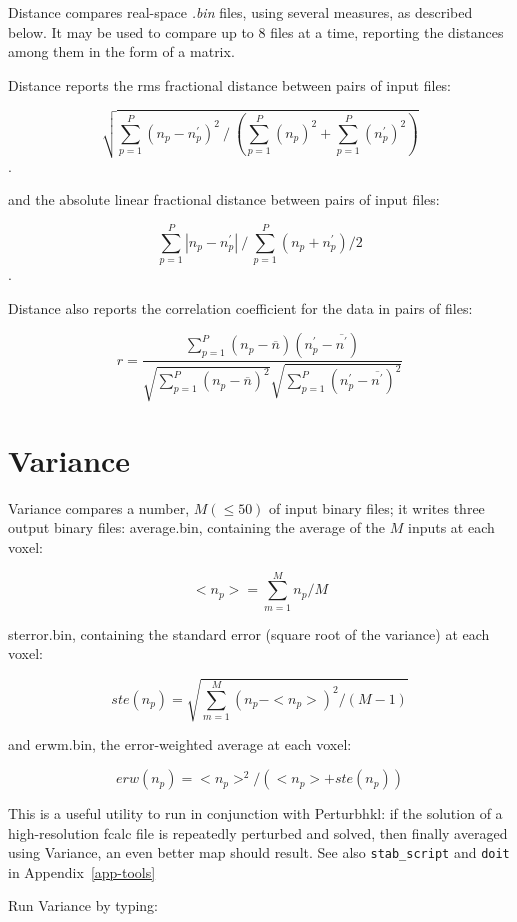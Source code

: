\documentclass{report}
\begin{document}
{

Distance compares real-space {\it .bin} files, using several measures,
as described below.
It may be used to compare up to 8 files at a time, reporting the distances
among them in the form of a matrix.

Distance reports
the rms fractional distance between pairs of input files:

$$\sqrt{ \sum_{p=1}^P {(n_p - n^\prime_p)^2}~/~(\sum_{p=1}^P {(n_p)^2} + \sum_{p=1}^P {(n^\prime_p)^2})}$$.

and the absolute linear fractional distance between pairs of input files:

$$ \sum_{p=1}^P {|n_p - n^\prime_p|}~/~\sum_{p=1}^P (n_p + n^\prime_p)/2$$.

Distance also reports the correlation coefficient 
for the data in pairs of files:

$$ r = \frac {\sum_{p=1}^P {(n_p-\overline{n})(n^\prime_p-\overline{n^\prime})}}
{\sqrt{\sum_{p=1}^P{(n_p-\overline{n})^2}}
 \sqrt{\sum_{p=1}^P{(n^\prime_p-\overline{n^\prime})^2}}} $$


\section {Variance}
\label{evaluation-variance}

Variance compares a number, $M (\le 50)$ of input binary files;  it writes 
three output binary files: average.bin, containing the average of the $M$ 
inputs at each voxel: 

$$ <n_{p}> = \sum_{m=1}^{M}n_{p} / M $$

sterror.bin, containing the standard error (square root of the variance) 
at each voxel:

$$ ste(n_{p}) = \sqrt{\sum_{m=1}^{M} (n_{p} - <n_{p}>)^2/(M-1)} $$

and erwm.bin, the error-weighted average at each voxel:

$$ erw(n_{p}) = <n_{p}>^2 / (<n_{p}> + ste(n_{p}))  $$

This is a useful utility to run in conjunction with Perturbhkl:
if the solution of a high-resolution fcalc file is repeatedly perturbed and
solved, then finally averaged using Variance, an even better map should result.
See also {\tt stab\_script} and {\tt doit} in Appendix~\ref{app-tools}

Run Variance by typing:

}
\end{document}
